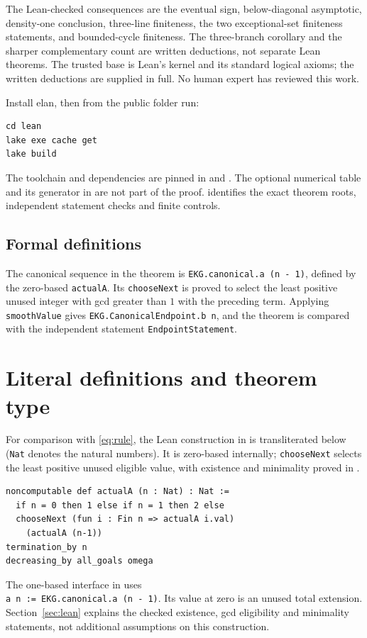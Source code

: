 The Lean-checked consequences are the eventual sign, below-diagonal
asymptotic, density-one conclusion, three-line finiteness, the two
exceptional-set finiteness statements, and bounded-cycle finiteness.
The three-branch corollary and the sharper complementary count are
written deductions, not separate Lean theorems. The trusted base is
Lean's kernel and its standard logical axioms; the written deductions
are supplied in full. No human expert has reviewed this work.

Install elan, then from the public folder run:
\begin{verbatim}
cd lean
lake exe cache get
lake build
\end{verbatim}
The toolchain and dependencies are pinned in 
and . The optional numerical table and
its generator in  are not part of the proof.
 identifies the exact theorem roots, independent
statement checks and finite controls.


\subsection*{Formal definitions}
The canonical sequence in the theorem is
\texttt{EKG.canonical.a (n - 1)}, defined by the zero-based
\texttt{actualA}. Its \texttt{chooseNext} is proved to select the least
positive unused integer with gcd greater than $1$ with the preceding
term. Applying \texttt{smoothValue} gives
\texttt{EKG.CanonicalEndpoint.b n}, and the theorem is compared with the
independent statement \texttt{EndpointStatement}.

\section{Literal definitions and theorem type}
For comparison with \eqref{eq:rule}, the Lean construction in
 is transliterated below (\texttt{Nat} denotes the
natural numbers). It is zero-based internally; \texttt{chooseNext}
selects the least positive unused eligible value, with existence and
minimality proved in .
\begin{verbatim}
noncomputable def actualA (n : Nat) : Nat :=
  if n = 0 then 1 else if n = 1 then 2 else
  chooseNext (fun i : Fin n => actualA i.val)
    (actualA (n-1))
termination_by n
decreasing_by all_goals omega
\end{verbatim}
The one-based interface in  uses\\
\texttt{a n := EKG.canonical.a (n - 1)}. Its value at zero is an
unused total extension. Section~\ref{sec:lean} explains the checked
existence, gcd eligibility and minimality statements, not additional
assumptions on this construction.

